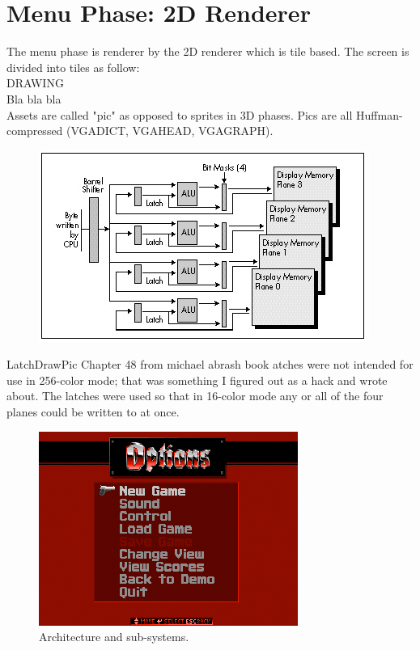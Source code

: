 \section{Menu Phase: 2D Renderer}
The menu phase is renderer by the 2D renderer which is tile based. The screen is divided into tiles as follow:\\
DRAWING\\
Bla bla bla\\
Assets are called "pic" as opposed to sprites in 3D phases. Pics  are all Huffman-compressed (VGADICT, VGAHEAD, 
VGAGRAPH).

 \begin{figure}[H]
\centering
 \includegraphics[width=\textwidth]{imgs/latches_drawing.png}
 \end{figure}

LatchDrawPic
Chapter 48 from michael abrash book
atches were not intended for use in 256-color mode; that was something I figured out as a hack and wrote about. The latches were used so that in 16-color mode any or all of the four planes could be written to at once.
\par
\begin{figure}[H]
\centering
\includegraphics[width=\textwidth]{imgs/first_menu.png}
\caption{Architecture and sub-systems.}
\end{figure}